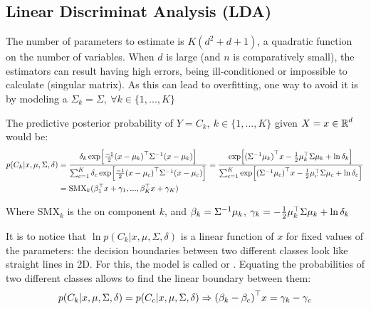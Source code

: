 \subsection{Linear Discriminat Analysis (LDA)}
The number of parameters to estimate is $K(d^2+d+1)$, a quadratic function on the number of variables. When $d$ is large (and $n$ is comparatively small), the estimators can result having high errors, being ill-conditioned or impossible to calculate (singular matrix). As this can lead to overfitting, one way to avoid it is by modeling a  $\Sigma_k=\Sigma,\ \forall k\in\{1,...,K\}$

The predictive posterior probability of $Y=C_k,\ k\in\{1,...,K\}$ given $X=x\in\operatorname{\mathbb{R}}^d$ would be:
\begin{align*}
    p(C_k|x,\mu,\Sigma,\delta) &= \frac{\delta_k \exp[\frac{-1}{2}{(x-\mu_k)}^\top{\Sigma}^{-1}(x-\mu_k)]}{\sum_{c=1}^K \delta_c \exp[\frac{-1}{2}{(x-\mu_c)}^\top{\Sigma}^{-1}(x-\mu_c)]} = \frac{\exp[{({\Sigma}^{-1}\mu_k)}^\top x-\frac{1}{2}{\mu}^\top_k\Sigma\mu_k+\ln\delta_k]}{\sum_{c=1}^K\exp[{({\Sigma}^{-1}\mu_c)}^\top x-\frac{1}{2}{\mu}^\top_c\Sigma\mu_c+\ln\delta_c]}\\
    &= \text{SMX}_k({\beta}^\top_1 x+\gamma_1,..., {\beta}^\top_K x+\gamma_K)
\end{align*}

Where $\text{SMX}_k$ is the  on component $k$, and $\beta_k={\Sigma}^{-1}\mu_k$, $\gamma_k = -\frac{1}{2}{\mu}^\top_k\Sigma\mu_k+\ln\delta_k$

It is to notice that $\ln p(C_k|x,\mu,\Sigma,\delta)$ is a linear function of $x$ for fixed values of the parameters: the decision boundaries between two different classes look like straight lines in 2D. For this, the model is called  or . Equating the probabilities of two different classes allows to find the linear boundary between them:
\begin{equation*}
    p(C_k|x,\mu,\Sigma,\delta)  = p(C_c|x,\mu,\Sigma,\delta) \Rightarrow {(\beta_k-\beta_c)}^\top x = \gamma_k-\gamma_c
\end{equation*}